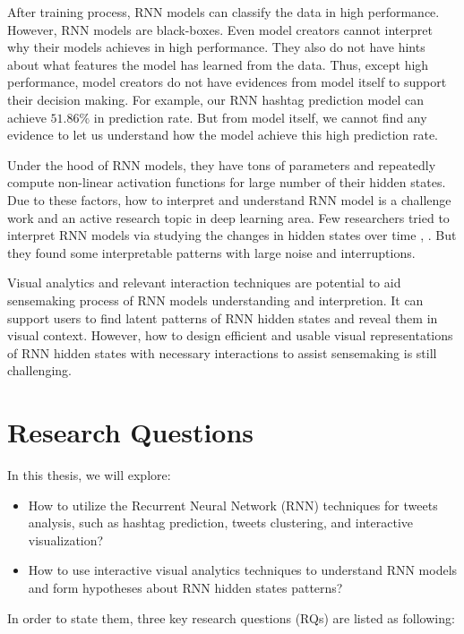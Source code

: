 After training process, RNN models can classify the data in high performance. However, RNN models are black-boxes. Even model creators cannot interpret why their models achieves in high performance. They also do not have hints about what features the model has learned from the data. Thus, except high performance, model creators do not have evidences from model itself to support their decision making.  For example, our RNN hashtag prediction model can achieve $51.86\%$ in prediction rate. But from model itself, we cannot find any evidence to let us understand how the model achieve this high prediction rate. 

Under the hood of RNN models, they have tons of parameters and repeatedly compute non-linear activation functions for large number of their hidden states. Due to these factors, how to interpret and understand RNN model is a challenge work and an active research topic in deep learning area. Few researchers tried to interpret RNN models via studying the changes in hidden states over time \cite{Strobelt2016} \cite{Li2016}, . But they found some interpretable patterns with large noise and interruptions. 

Visual analytics and relevant interaction techniques are potential to aid sensemaking process \cite{Pirolli2005} of RNN models understanding and interpretion. It can support users to find latent patterns of RNN hidden states and reveal them in visual context. However, how to design efficient and usable visual representations of RNN hidden states with necessary interactions to assist sensemaking is still challenging.

\section{Research Questions}

In this thesis, we will explore:

\begin{itemize}
    \item How to utilize the Recurrent Neural Network (RNN) techniques for tweets analysis, such as hashtag prediction, tweets clustering, and interactive visualization?
    \item How to use interactive visual analytics techniques to understand RNN models and form hypotheses about RNN hidden states patterns?
\end{itemize}


In order to state them, three key research questions (RQs) are listed as following: 


